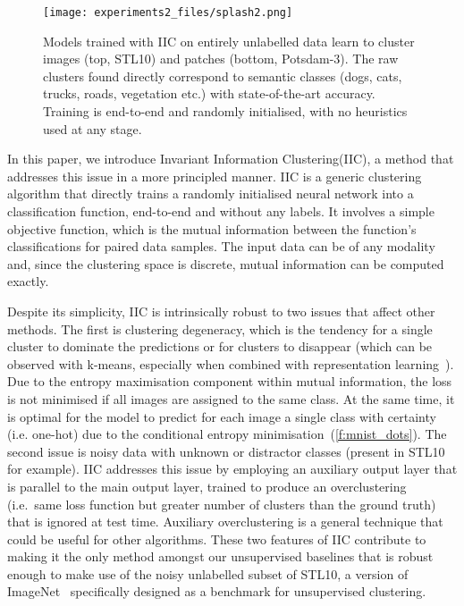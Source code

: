\documentclass[10pt,twocolumn,letterpaper]{article}
\newcommand{\methodname}{Invariant Information Clustering\xspace}
\newcommand{\methodnameshort}{IIC\xspace}
\begin{document}
\begin{figure}[t]

\texttt{[image: experiments2\_files/splash2.png]}

\caption{\label{f:splash} Models trained with \methodnameshort on entirely unlabelled data learn to cluster images (top, STL10) and patches (bottom, Potsdam-3). The raw clusters found directly correspond to semantic classes (dogs, cats, trucks, roads, vegetation etc.) with state-of-the-art accuracy.  Training is end-to-end and randomly initialised, with no heuristics used at any stage.}
\end{figure}
 
In this paper, we introduce \methodname (\methodnameshort), a method that addresses this issue in a more principled manner.
\methodnameshort is a generic clustering algorithm that directly trains a randomly initialised neural network into a classification function, end-to-end and without any labels.
It involves a simple objective function, which is the mutual information between the function's classifications for paired data samples. The input data can be of any modality and, since the clustering space is discrete, mutual information can be computed exactly.

Despite its simplicity, \methodnameshort is intrinsically robust to two issues that affect other methods.
The first is clustering degeneracy, which is the tendency for a single cluster to dominate the predictions or for clusters to disappear (which can be observed with k-means, especially when combined with representation learning~\cite{caron2018deep}).
Due to the entropy maximisation component within mutual information, the loss is not minimised if all images are assigned to the same class. At the same time, it is optimal for the model to predict for each image a single class with certainty (i.e. one-hot) due to the conditional entropy minimisation~(\cref{f:mnist_dots}). The second issue is noisy data with unknown or distractor classes (present in STL10~\cite{coates2011analysis} for example).
\methodnameshort addresses this issue by employing an auxiliary output layer that is parallel to the main output layer, trained to produce an overclustering (i.e.\ same loss function but greater number of clusters than the ground truth) that is ignored at test time.
Auxiliary overclustering is a general technique that could be useful for other algorithms.
These two features of \methodnameshort contribute to making it the only method amongst our unsupervised baselines that is robust enough to make use of the noisy unlabelled subset of STL10, a version of ImageNet~\cite{deng2009imagenet} specifically designed as a benchmark for unsupervised clustering.
\end{document}
